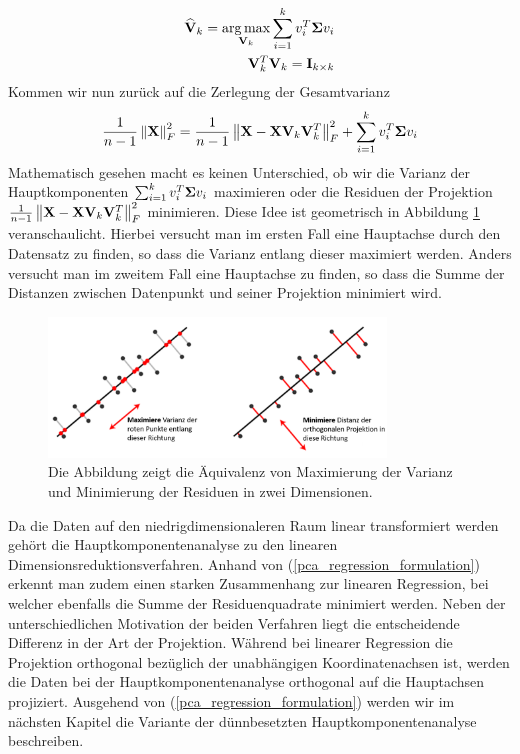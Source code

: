 \begin{align}
\label{pca_variance_maximization}
\begin{split}
\widehat{\mathbf{V}}_k = \operatorname*{arg\,max}_{\mathbf{V}_k}\sum_{i=1}^{k} v_i^T \mathbf{\Sigma} v_i\\
\mathbf{V}_k^T\mathbf{V}_k = \mathbf{I}_{k \times k}
\end{split}
\end{align}
Kommen wir nun zurück auf die Zerlegung der Gesamtvarianz
\begin{align*}
\frac{1}{n-1}\left\lVert \mathbf{X} \right\rVert_{F}^{2} = \frac{1}{n-1}\left\lVert \mathbf{X} - \mathbf{X} \mathbf{V}_k \mathbf{V}_k^T \right\rVert_{F}^{2} + \sum_{i=1}^{k} v_i^T \mathbf{\Sigma} v_i
\end{align*} 
Mathematisch gesehen macht es keinen Unterschied, ob wir die Varianz der Hauptkomponenten $\sum_{i=1}^{k} v_i^T \mathbf{\Sigma} v_i$ maximieren oder die Residuen der Projektion $\frac{1}{n-1}\left\lVert \mathbf{X} - \mathbf{X} \mathbf{V}_k \mathbf{V}_k^T \right\rVert_{F}^{2}$ minimieren. Diese Idee ist geometrisch in Abbildung \ref{pca_projection_explanation} veranschaulicht. Hierbei versucht man im ersten Fall eine Hauptachse durch den Datensatz zu finden, so dass die Varianz entlang dieser maximiert werden. Anders versucht man im zweitem Fall eine Hauptachse zu finden, so dass die Summe der Distanzen zwischen Datenpunkt und seiner Projektion minimiert wird.
\begin{figure}
\centering
\includegraphics[width = 0.8\textwidth]{figures/pca_projection_explanation_german.png}
\caption{Die Abbildung zeigt die Äquivalenz von Maximierung der Varianz und Minimierung der Residuen in zwei Dimensionen.}
\label{pca_projection_explanation}
\end{figure} 

Da die Daten auf den niedrigdimensionaleren Raum linear transformiert werden gehört die Hauptkomponentenanalyse zu den linearen Dimensionsreduktionsverfahren. Anhand von (\ref{pca_regression_formulation}) erkennt man zudem einen starken Zusammenhang zur linearen Regression, bei welcher ebenfalls die Summe der Residuenquadrate minimiert werden. Neben der unterschiedlichen Motivation der beiden Verfahren liegt die entscheidende Differenz in der Art der Projektion. Während bei linearer Regression die Projektion orthogonal bezüglich der unabhängigen Koordinatenachsen ist, werden die Daten bei der Hauptkomponentenanalyse orthogonal auf die Hauptachsen projiziert. Ausgehend von (\ref{pca_regression_formulation}) werden wir im nächsten Kapitel die Variante der dünnbesetzten Hauptkomponentenanalyse beschreiben.

